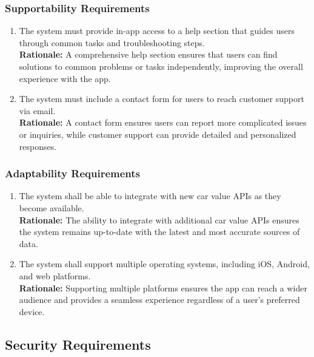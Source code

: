 \documentclass[]{article}
\begin{document}
\subsubsection{Supportability Requirements}
\label{ssub:supportability_requirements}
\begin{enumerate}[{MS-S}1. ]
	\item The system must provide in-app access to a help section that guides users through common tasks and troubleshooting steps.\\
	\textbf{Rationale:} A comprehensive help section ensures that users can find solutions to common problems or tasks independently, improving the overall experience with the app.
	\item The system must include a contact form for users to reach customer support via email.\\
	\textbf{Rationale:} A contact form ensures users can report more complicated issues or inquiries, while customer support can provide detailed and personalized responses.
\end{enumerate}

\subsubsection{Adaptability Requirements}
\label{ssub:adaptability_requirements}
\begin{enumerate}[{MS-A}1. ]
	\item The system shall be able to integrate with new car value APIs as they become available.\\
	\textbf{Rationale:} The ability to integrate with additional car value APIs ensures the system remains up-to-date with the latest and most accurate sources of data.
	\item The system shall support multiple operating systems, including iOS, Android, and web platforms.\\
	\textbf{Rationale:} Supporting multiple platforms ensures the app can reach a wider audience and provides a seamless experience regardless of a user's preferred device.
\end{enumerate}


\subsection{Security Requirements}
\label{sub:security_requirements}
\end{document}

